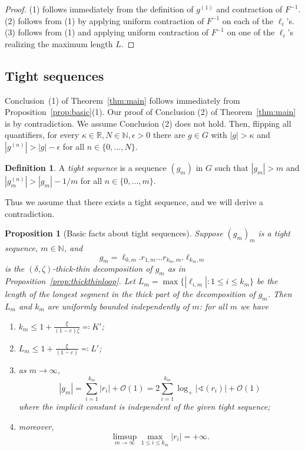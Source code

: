 \documentclass{amsart}
\newcommand\R{{\mathbb{R}}}
\newcommand\N{{\mathbb{N}}}
\newtheorem{prop}[thm]{Proposition}
\theoremstyle{definition}
\newtheorem{defn}[thm]{Definition}
\theoremstyle{remark}
\begin{document}
\begin{proof} (1) follows immediately from the definition of $g^{(1)}$ and   contraction of $F^{-1}$. (2) follows from (1) by applying 
uniform contraction of $F^{-1}$ on each of the $\ell_i$'s.  (3) follows from (1) and applying uniform contraction of $F^{-1}$ on one of the $\ell_i$'s realizing the maximum length $L$.
\end{proof}

\subsection{Tight sequences} 
Conclusion~(1) of Theorem~\ref{thm:main} follows immediately from Proposition~\ref{prop:basic}(1).  Our proof of Conclusion (2) of Theorem~\ref{thm:main} is  by contradiction. We assume Conclusion (2) does not hold.   Then, flipping all quantifiers, for every $\kappa\in\R,N\in\N,\epsilon>0$ there are $g\in G$ with $|g|>\kappa$ and $|g^{(n)}|>|g|-\epsilon$ for all $n\in\{0,\dots,N\}$.

\begin{defn}\label{defn:tight}
  A \emph{tight sequence} is a sequence $(g_m)$ in $G$ such that $|g_m|>m$ and $|g_m^{(n)}|>|g_m|-1/m$ for all $n\in\{0,\dots,m\}$.
\end{defn}
Thus we assume that there exists a tight sequence, and we will derive a contradiction.

\begin{prop}[Basic facts about tight sequences]\label{prop:tightfacts}
Suppose $(g_m)_m$ is a tight sequence, $m\in \N$, and 
\[ g_m = \ell_{0,m}.r_{1,m}\ldots r_{k_m,m}. \ell_{k_m,m}\]
is the $(\delta, \zeta)$-thick-thin decomposition of $g_m$ as in Proposition~\ref{prop:thickthinloop}. Let $L_m=\max\{|\ell_{i,m}|: 1 \leq i \leq k_m\}$ be the length of the longest segment in the thick part of the decomposition of $g_m$.  Then $L_m$ and $k_m$ are uniformly bounded independently of $m$: for all $m$ we have 
\begin{enumerate}
\item $k_m \leq 1+ \frac{\xi}{(1-c)\zeta}\eqqcolon K'$;
\item $L_m \leq 1+ \frac{\xi}{(1-c)}\eqqcolon L'$;
\item as $m\to\infty$, 
 \[ |g_m| = \sum_{i=1}^{k_m} |r_i| + \mathcal O(1) = 2\sum_{i=1}^{k_m}\log_+|\sphericalangle(r_i)|+\mathcal O(1)\]
 where the implicit constant is independent of the given tight sequence;
\item moreover,
\begin{equation}\label{eq:unbounded}
  \limsup_{m\to\infty}\max_{1 \leq i \leq k_m}|r_i| = +\infty.
\end{equation}
\end{enumerate}
\end{prop}
\end{document}
